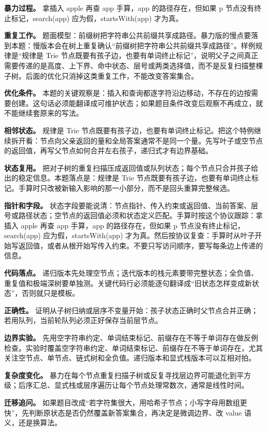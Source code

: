 \textbf{暴力过程。} 拿插入 apple 再查 app 手算，app 的路径存在，但如果 p 节点没有终止标记，search(app) 应为假，startsWith(app) 才为真。

\textbf{重复工作。} 题面模型：前缀树把字符串公共前缀共享成路径。暴力版的慢点要落到本题：慢版本会在树上重复确认“前缀树把字符串公共前缀共享成路径”。样例规律是“规律是 Trie 节点既要有孩子边，也要有单词终止标记”，说明父子之间真正需要传递的是高度、上下界、命中状态、层号或两类选择值，而不是反复扫描整棵子树。后面的优化只消掉这类重复工作，不能改变答案集合。

\textbf{优化条件。} 本题的关键观察是：插入和查询都逐字符沿边移动，不存在的边按需要创建。这句话必须能翻译成可维护状态；如果题目条件改变后观察不再成立，就不能继续套原来的写法。

\textbf{相邻状态。} 规律是 Trie 节点既要有孩子边，也要有单词终止标记。把这个特例继续拆开看：节点向父亲返回的量和全局答案通常不是同一个量。先写叶子或空节点的返回值，再写父节点如何合并左右孩子，递归式才有边界基础。

\textbf{状态复用。} 把对子树的重复扫描压成返回值或队列状态；每个节点只合并孩子给出的稳定信息。本题落点是：规律是 Trie 节点既要有孩子边，也要有单词终止标记。手算时只改被新输入影响的那一小部分，而不是回头重算完整候选。

\textbf{指针和字段。} 状态字段要能说清：节点指针、传入约束或返回值、当前答案、层号或路径状态；空节点的返回值必须和状态定义匹配。手算时按这个协议跟踪：拿插入 apple 再查 app 手算，app 的路径存在，但如果 p 节点没有终止标记，search(app) 应为假，startsWith(app) 才为真。然后按协议复查：手算时从叶子开始写返回值，或者从根开始写传入约束。不要只写访问顺序，要写每条边上传递的信息。

\textbf{代码落点。} 递归版本先处理空节点；迭代版本的栈元素要带完整状态；全负值、重复值和极端深树要单独测。关键代码行必须能逐句翻译成“旧状态怎样变成新状态”，否则就只是模板。

\textbf{正确性。} 证明从子树归纳或层序不变量开始：孩子状态正确时父节点合并正确；若用队列，当前轮队列必须正好保存当前层节点。

\textbf{边界实验。} 先用空字符串约定、单词结束标记、前缀存在不等于单词存在做反例检查。实验时覆盖空字符串约定、单词结束标记、前缀存在不等于单词存在，尤其关注空节点、单节点、链式树和全负值。递归版本和显式栈版本可以互相对拍。

\textbf{复杂度变化。} 暴力在每个节点重复扫描子树或反复寻找层边界可能退化到平方级；后序汇总、显式栈或层序遍历让每个节点处理常数次，通常是线性时间。

\textbf{迁移追问。} 如果题目改成“若字符集很大，用哈希子节点；小写字母用数组更快”，先判断原状态是否仍然覆盖新答案集合，再决定是微调边界、改 value 语义，还是换算法。

